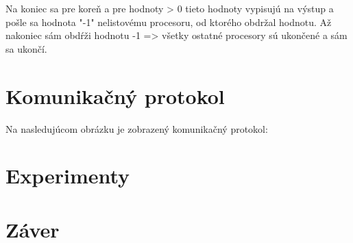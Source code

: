 \documentclass[12pt,a4paper,titlepage,final]{article}
\begin{document}
Na koniec sa pre koreň a pre hodnoty > 0 tieto hodnoty vypisujú na výstup a pošle sa hodnota "-1" nelistovému procesoru, od ktorého obdržal hodnotu. Až nakoniec sám obdŕži hodnotu -1 => všetky ostatné procesory sú ukončené a sám sa ukončí.


\section{Komunikačný protokol}
Na nasledujúcom obrázku je zobrazený komunikačný protokol:






\section{Experimenty}


\section{Záver}
\end{document}
